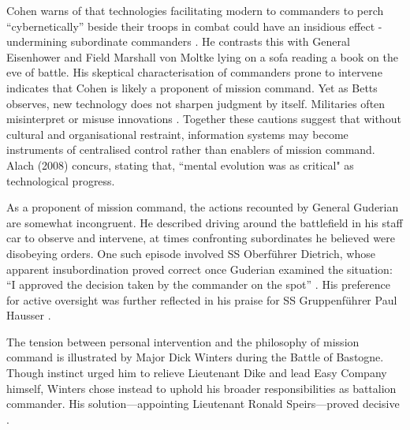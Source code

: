 Cohen warns of that technologies facilitating modern to commanders to perch ``cybernetically'' beside their troops in combat could have an insidious effect - undermining subordinate commanders \parencite{COHEN_1996}. He contrasts this with General Eisenhower and Field Marshall von Moltke lying on a sofa reading a book on the eve of battle. His skeptical characterisation of commanders prone to intervene indicates that Cohen is likely a proponent of mission command. Yet as Betts observes, new technology does not sharpen judgment by itself. Militaries often misinterpret or misuse innovations \parencite{BETTS_1996}. Together these cautions suggest that without cultural and organisational restraint, information systems may become instruments of centralised control rather than enablers of mission command. Alach (2008) concurs, stating that, ``mental evolution was as critical" as technological progress\nocite{ALACH_2008}.

As a proponent of mission command, the actions recounted by General Guderian are somewhat incongruent. He described driving around the battlefield in his staff car to observe and intervene, at times confronting subordinates he believed were disobeying orders. One such episode involved SS Oberf\"uhrer  Dietrich, whose apparent insubordination proved correct once Guderian examined the situation: ``I approved the decision taken by the commander on the spot'' \parencite[p.~117]{GUDERIAN_1952}. His preference for active oversight was further reflected in his praise for SS Gruppenf\"uhrer Paul Hausser \parencite[p.~73]{YEIDE_2011}. %

The tension between personal intervention and the philosophy of mission command is illustrated by Major Dick Winters during the Battle of Bastogne. Though instinct urged him to relieve Lieutenant Dike and lead Easy Company himself, Winters chose instead to uphold his broader responsibilities as battalion commander. His solution---appointing Lieutenant Ronald Speirs---proved decisive \parencite[p.~186]{WINTERS_2006}.  

